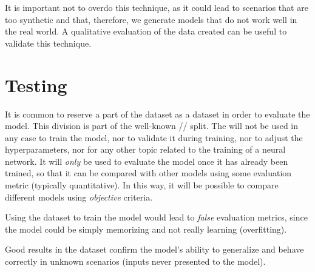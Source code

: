 \begin{remarkBox}
  It is important not to overdo this technique, as it could lead to scenarios
  that are too synthetic and that, therefore, we generate models that do not
  work well in the real world. A qualitative evaluation of the data created can
  be useful to validate this technique.
\end{remarkBox}



\section{Testing}


It is common to reserve a part of the dataset as a  dataset in order
to evaluate the model. This division is part of the well-known
// split. The  will not be used in
any case to train the model, nor to validate it during training, nor to adjust
the hyperparameters, nor for any other topic related to the training of a
neural network. It will \emph{only} be used to evaluate the model once it has
already been trained, so that it can be compared with other models using some
evaluation metric (typically quantitative). In this way, it will be possible to
compare different models using \emph{objective} criteria.

\begin{remarkBox}
  Using the  dataset to train the model would lead to \emph{false}
  evaluation metrics, since the model could be simply memorizing and not really
  learning (overfitting).
\end{remarkBox}

Good results in the  dataset confirm the model's ability to
generalize and behave correctly in unknown scenarios (inputs never presented to
the model).
